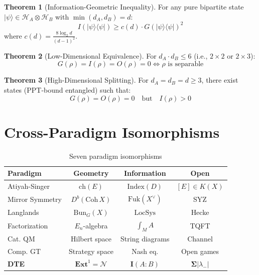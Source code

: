 \documentclass[11pt,a4paper]{article}
\theoremstyle{definition}
\newtheorem{theorem}{Theorem}[section]
\begin{document}
\begin{theorem}[Information-Geometric Inequality]
\label{thm:info_geo}
For any pure bipartite state $|\psi\rangle \in \mathcal{H}_A \otimes \mathcal{H}_B$ with $\min(d_A, d_B) = d$:
\begin{equation}
I(|\psi\rangle\langle\psi|) \geq c(d) \cdot G(|\psi\rangle\langle\psi|)^2
\end{equation}
where $c(d) = \frac{8\log_2 d}{(d-1)^2}$.
\end{theorem}

\begin{theorem}[Low-Dimensional Equivalence]
\label{thm:low_dim}
For $d_A \cdot d_B \leq 6$ (i.e., $2\times 2$ or $2\times 3$):
\begin{equation}
G(\rho) = I(\rho) = O(\rho) = 0 \iff \rho \text{ is separable}
\end{equation}
\end{theorem}

\begin{theorem}[High-Dimensional Splitting]
\label{thm:high_dim}
For $d_A = d_B = d \geq 3$, there exist states (PPT-bound entangled) such that:
\begin{equation}
G(\rho) = O(\rho) = 0 \quad \text{but} \quad I(\rho) > 0
\end{equation}
\end{theorem}

\section{Cross-Paradigm Isomorphisms}
\label{sec:paradigm}

\begin{table}[h]
\centering
\caption{Seven paradigm isomorphisms}
\begin{tabular}{lccc}
\toprule
\textbf{Paradigm} & \textbf{Geometry} & \textbf{Information} & \textbf{Open} \\
\midrule
Atiyah-Singer & $\mathrm{ch}(E)$ & $\mathrm{Index}(D)$ & $[E] \in K(X)$ \\
Mirror Symmetry & $D^b(\mathrm{Coh}\, X)$ & $\mathrm{Fuk}(X^\vee)$ & SYZ \\
Langlands & $\mathrm{Bun}_G(X)$ & $\mathrm{LocSys}$ & Hecke \\
Factorization & $E_n$-algebra & $\int_M A$ & TQFT \\
Cat. QM & Hilbert space & String diagrams & Channel \\
Comp. GT & Strategy space & Nash eq. & Open games \\
\textbf{DTE} & $\mathbf{Ext}^1 = \mathcal{N}$ & $\mathbf{I}(A\!:\!B)$ & $\mathbf{\Sigma}|\lambda_-|$ \\
\bottomrule
\end{tabular}
\end{table}
\end{document}
